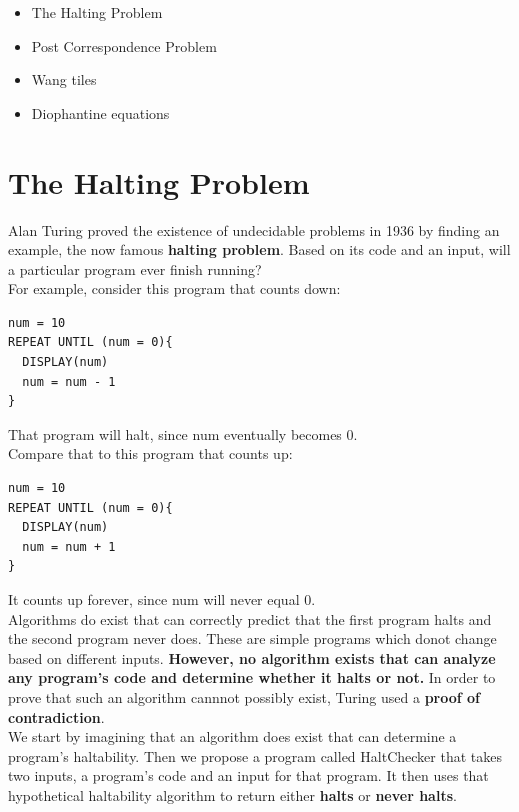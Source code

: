 \documentclass[
	12pt, %
]{fphw}
\begin{document}
\begin{itemize}
\item The Halting Problem
\item Post Correspondence Problem
\item Wang tiles  
\item Diophantine equations
\end{itemize}

\newpage
\section*{{\color{BlueViolet}The Halting Problem}}

Alan Turing proved the existence of undecidable problems in 1936 by finding an example, the now famous \textbf{halting problem}. Based on its code and an input, will a particular program ever finish running?\\

For example, consider this program that counts down:\\

\begin{verbatim}
num = 10
REPEAT UNTIL (num = 0){
  DISPLAY(num)
  num = num - 1
}
\end{verbatim}

That program will halt, since num eventually becomes 0.\\
Compare that to this program that counts up:

\begin{verbatim}
num = 10
REPEAT UNTIL (num = 0){
  DISPLAY(num)
  num = num + 1
}
\end{verbatim}

It counts up forever, since num will never equal 0.\\

Algorithms do exist that can correctly predict that the first program halts and the second program never does. These are simple programs which donot change based on different inputs. \textbf{However, no algorithm exists that can analyze any program's code and determine whether it halts or not.} In order to prove that such an algorithm cannnot possibly exist, Turing used a \textbf{proof of contradiction}.\\

We start by imagining that an algorithm does exist that can determine a program's haltability. Then we propose a program called HaltChecker that takes two inputs, a program's code and an input for that program. It then uses that hypothetical haltability algorithm to return either \textbf{halts} or \textbf{never halts}.\\
\end{document}
